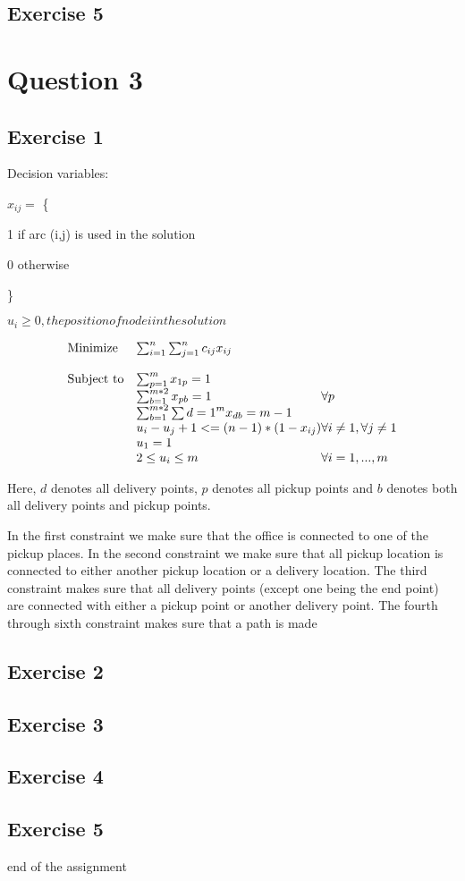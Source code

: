 \documentclass{article}
\begin{document}
\subsection{Exercise 5}

\section{Question 3}

\subsection{Exercise 1}

Decision variables:

$x_{ij}=$ \{

1 if arc (i,j) is used in the solution

0 otherwise

\}

$u_i\geq 0, the position of node i in the solution$


\begin{equation*}
  \begin{array}{ll@{}ll}
  \text{Minimize}  & \sum_{i = 1}^{n}\sum_{j = 1}^{n} c_{ij}x_{ij}  &  \\
                   & \\
  \text{Subject to}& \sum_{p = 1}^{m} x_{1p}=1 & \\
                   & \sum_{b = 1}^{m*2} x_{pb}=1 & \forall p \\
                   & \sum_{b = 1}^{m*2}\sum{d = 1}^{m} x_{db}=m-1 & \\
                   & u_i-u_j+1<=(n-1)*(1-x_{ij}) & \forall i \neq 1, \forall j \neq 1\\
                   & u_1=1 & \\
                   & 2\leq u_i \leq m & \forall i=1,... , m
  \end{array}
\end{equation*}

Here, $d$ denotes all delivery points, $p$ denotes all pickup points and $b$ denotes both all delivery points and pickup points. 

In the first constraint we make sure that the office is connected to one of the pickup places.
In the second constraint we make sure that all pickup location is connected to either another pickup location or a delivery location.
The third constraint makes sure that all delivery points (except one being the end point) are connected with either a pickup point or another delivery point.
The fourth through sixth constraint makes sure that a path is made 

\subsection{Exercise 2}
\subsection{Exercise 3}
\subsection{Exercise 4}
\subsection{Exercise 5}


end of the assignment
\end{document}
